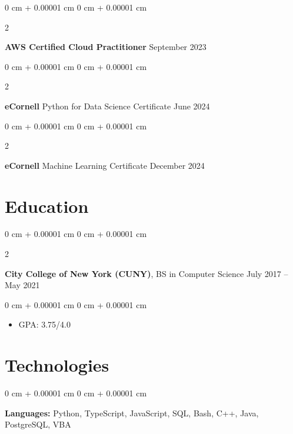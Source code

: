 \documentclass[10pt, letterpaper]{article}
\newenvironment{highlights}{
    \begin{itemize}[
        topsep=0.10 cm,
        parsep=0.10 cm,
        partopsep=0pt,
        itemsep=0pt,
        leftmargin=0 cm + 10pt
    ]
}{
    \end{itemize}
} %
\newenvironment{onecolentry}{
    \begin{adjustwidth}{
        0 cm + 0.00001 cm
    }{
        0 cm + 0.00001 cm
    }
}{
    \end{adjustwidth}
} %
\newenvironment{twocolentry}[2][]{
    \onecolentry
    \def\secondColumn{#2}
    \setcolumnwidth{\fill, 4.5 cm}
    \begin{paracol}{2}
}{
    \switchcolumn \raggedleft \secondColumn
    \end{paracol}
    \endonecolentry
} %
\begin{document}
        
        \begin{twocolentry}{
            September 2023
        }
            \textbf{AWS Certified Cloud Practitioner}\end{twocolentry}
        \vspace{0.10 cm}
        

        \begin{twocolentry}{
            June 2024
        }
            \textbf{eCornell} Python for Data Science Certificate\end{twocolentry}
        \vspace{0.10 cm}
        

        \begin{twocolentry}{
            December 2024
        }
            \textbf{eCornell} Machine Learning Certificate\end{twocolentry}

        \vspace{0.10 cm}

    \vspace{.3 cm}
    
    \section{Education}

        
        \begin{twocolentry}{
            July 2017 -- May 2021
        }
            \textbf{City College of New York (CUNY)}, BS in Computer Science\end{twocolentry}

        \vspace{0.10 cm}
        \begin{onecolentry}
            \begin{highlights}
                \item GPA: 3.75/4.0
            \end{highlights}
        \end{onecolentry}


    \vspace{.3 cm}
    
    \section{Technologies}

    \begin{onecolentry}
        \textbf{Languages:} Python, TypeScript, JavaScript, SQL, Bash, C++, Java, PostgreSQL, VBA
    \end{onecolentry}
\end{document}
